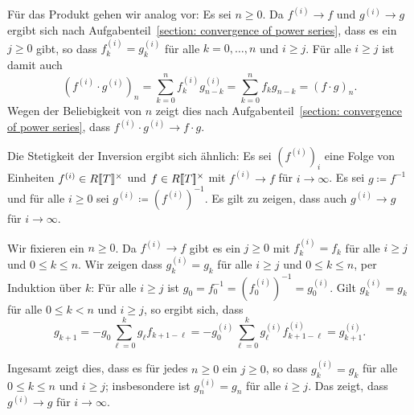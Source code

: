 \documentclass[a4paper, 10pt, numbers=noenddot]{scrartcl}
\begin{document}
Für das Produkt gehen wir analog vor:
Es sei $n \geq 0$.
Da $f^{(i)} \to f$ und $g^{(i)} \to g$ ergibt sich nach Aufgabenteil~\ref{section: convergence of power series}, dass es ein $j \geq 0$ gibt, so dass $f^{(i)}_k = g^{(i)}_k$ für alle $k = 0, \dotsc, n$ und $i \geq j$.
Für alle $i \geq j$ ist damit auch
\[
    (f^{(i)} \cdot g^{(i)})_n
  = \sum_{k = 0}^n f^{(i)}_k g^{(i)}_{n-k}
  = \sum_{k = 0}^n f_k g_{n-k}
  = (f \cdot g)_n.
\]
Wegen der Beliebigkeit von $n$ zeigt dies nach Aufgabenteil~\ref{section: convergence of power series}, dass $f^{(i)} \cdot g^{(i)} \to f \cdot g$.

Die Stetigkeit der Inversion ergibt sich ähnlich:
Es sei $(f^{(i)})_i$ eine Folge von Einheiten $f^{(i)} \in R[\![T]\!]^\times$  und $f \in R[\![T]\!]^\times$ mit $f^{(i)} \to f$ für $i \to \infty$.
Es sei $g \coloneqq f^{-1}$ und für alle $i \geq 0$ sei $g^{(i)} \coloneqq (f^{(i)})^{-1}$.
Es gilt zu zeigen, dass auch $g^{(i)} \to g$ für $i \to \infty$.

Wir fixieren ein $n \geq 0$.
Da $f^{(i)} \to f$ gibt es ein $j \geq 0$ mit $f^{(i)}_k = f_k$ für alle $i \geq j$ und $0 \leq k \leq n$.
Wir zeigen dass $g^{(i)}_k = g_k$ für alle $i \geq j$ und $0 \leq k \leq n$, per Induktion über $k$:
Für alle $i \geq j$ ist $g_0 = f_0^{-1} = (f^{(i)}_0)^{-1} = g^{(i)}_0$.
Gilt $g^{(i)}_k = g_k$ für alle $0 \leq k < n$ und $i \geq j$, so ergibt sich, dass
\[
    g_{k+1}
  = - g_0 \sum_{\ell=0}^k g_\ell f_{k+1-\ell}
  = - g^{(i)}_0 \sum_{\ell=0}^k g^{(i)}_\ell f^{(i)}_{k+1-\ell}
  = g^{(i)}_{k+1}.
\]

Ingesamt zeigt dies, dass es für jedes $n \geq 0$ ein $j \geq 0$, so dass $g^{(i)}_k = g_k$ für alle $0 \leq k \leq n$ und $i \geq j$; insbesondere ist $g^{(i)}_n = g_n$ für alle $i \geq j$.
Das zeigt, dass $g^{(i)} \to g$ für $i \to \infty$.
\end{document}
